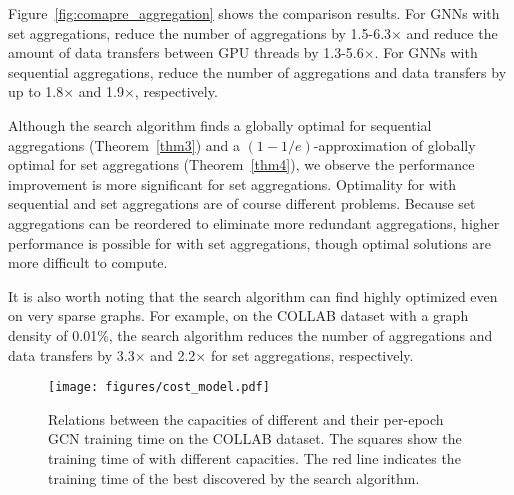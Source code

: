 


Figure~\ref{fig:comapre_aggregation} shows the comparison results.
For GNNs with set aggregations, \xgs reduce the number of aggregations by 1.5-6.3$\times$ and reduce the amount of data transfers between GPU threads by 1.3-5.6$\times$. 
For GNNs with sequential aggregations, \xgs reduce the number of aggregations and data transfers by up to 1.8$\times$ and 1.9$\times$, respectively.

Although the search algorithm finds a globally optimal \xg for sequential aggregations (Theorem~\ref{thm3}) and a $(1-1/e)$-approximation of globally optimal \xgs for set aggregations (Theorem~\ref{thm4}), we observe the performance improvement is more significant for set aggregations.
Optimality for \xgs with sequential and set aggregations are of course different problems.
Because set aggregations can be reordered to eliminate more redundant aggregations, higher performance is possible for \xgs with set aggregations, though optimal solutions are more difficult to compute.

It is also worth noting that the \xg search algorithm can find highly optimized \xgs even on very sparse graphs.
For example, on the COLLAB dataset with a graph density of 0.01\%, the \xg search algorithm reduces the number of aggregations and data transfers by 3.3$\times$ and 2.2$\times$ for set aggregations, respectively.

\begin{figure}[t]
    \centering
    \texttt{[image: figures/cost\_model.pdf]}
    \vspace{-4mm}
    \caption{Relations between the capacities of different \xgs and their per-epoch GCN training time on the COLLAB dataset. The squares show the training time of \xgs with different capacities. The red line indicates the training time of the best discovered \xg by the search algorithm.}
    \label{fig:capacity}
\end{figure}

